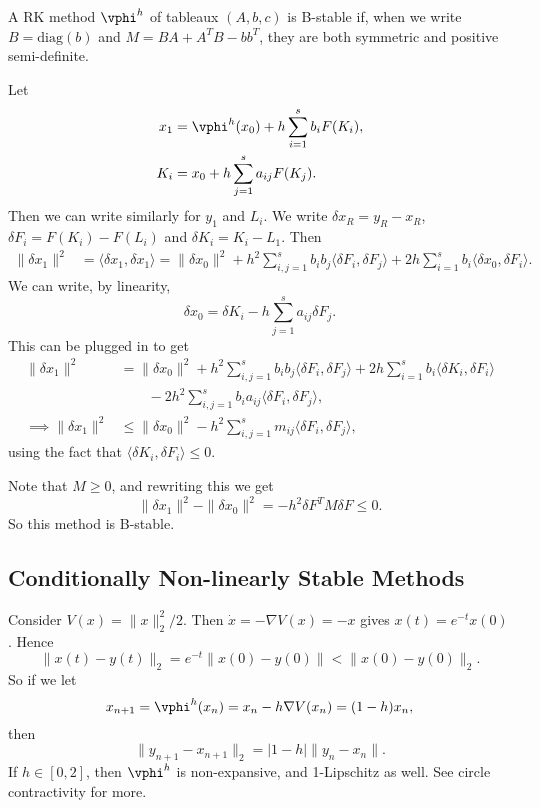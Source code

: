 \documentclass[12pt]{article}
\begin{document}
\begin{proposition}
	A RK method $\vphi^{h}$ of tableaux $(A, b, c)$ is B-stable if, when we write $B = \mathrm{diag}(b)$ and $M = BA + A^{T}B - b b^{T}$, they are both symmetric and positive semi-definite.
\end{proposition}

\begin{proofbox}
	Let
	\begin{align*}
		x_1 &= \vphi^{h} (x_0) + h \sum_{i = 1}^{s} b_i F(K_i), \\
		K_i &= x_0 + h \sum_{j = 1}^{s} a_{ij} F(K_j).
	\end{align*}
	Then we can write similarly for $y_1$ and $L_i$. We write $\delta x_R = y_R - x_R$, $\delta F_i = F(K_i) - F(L_i)$ and $\delta K_i = K_i - L_1$. Then
	\begin{align*}
		\|\delta x_1\|^2 &= \langle \delta x_1, \delta x_1 \rangle = \|\delta x_0\|^2 + h^2 \sum_{i, j = 1}^{s} b_i b_j \langle \delta F_i, \delta F_j \rangle + 2 h \sum_{i = 1}^{s} b_i \langle \delta x_0, \delta F_i \rangle.
	\end{align*}
	We can write, by linearity,
	\[
	\delta x_0 = \delta K_i - h \sum_{j = 1}^{s} a_{ij} \delta F_j.
	\]
	This can be plugged in to get
	\begin{align*}
		\|\delta x_1\|^2 &= \|\delta x_0\|^2 + h^2 \sum_{i, j = 1}^{s} b_i b_j \langle \delta F_i, \delta F_j \rangle + 2 h \sum_{i = 1}^{s} b_i \langle \delta K_i, \delta F_i \rangle \\
				 & \qquad - 2 h^2 \sum_{i, j = 1}^{s} b_i a_{ij} \langle \delta F_i, \delta F_j \rangle, \\
		\implies \|\delta x_1\|^2 &\leq \|\delta x_0\|^2 - h^2 \sum_{i, j = 1}^{s} m_{ij} \langle \delta F_i, \delta F_j \rangle,
	\end{align*}
	using the fact that $\langle \delta K_i, \delta F_i \rangle \leq 0$.

	Note that $M \geq 0$, and rewriting this we get
	\[
	\|\delta x_1\|^2 - \|\delta x_0\|^2 = -h^2 \delta F^{T} M \delta F \leq 0.
	\]
	So this method is B-stable.
\end{proofbox}


\subsection{Conditionally Non-linearly Stable Methods}%
\label{sub:cnsm}

Consider $V(x) = \|x\|_2^2/2$. Then $\dot x = - \nabla V(x) = - x$ gives $x(t) = e^{-t}x(0)$. Hence
\[
\|x(t) - y(t)\|_2 = e^{-t} \|x(0) - y(0)\| < \|x(0) - y(0)\|_2.
\]
So if we let
\[
x_{n+1} = \vphi^{h}(x_n) = x_n - h \nabla V(x_n) = (1 - h) x_n,
\]
then
\[
\|y_{n+1} - x_{n+1}\|_2 = |1 - h| \|y_n - x_n\|.
\]
If $h \in [0, 2]$, then $\vphi^{h}$ is non-expansive, and 1-Lipschitz as well. See circle contractivity for more.
\end{document}
